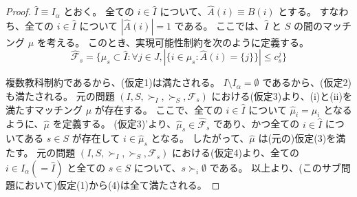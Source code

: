\documentclass[12pt, a4paper]{article}
\theoremstyle{definition}
\theoremstyle{remark}
\theoremstyle{plain}
\begin{document}
\begin{proof}

$\widehat{I} \equiv I_\alpha$ とおく。
全ての $i \in \widehat{I}$ について、$\widehat{A}(i) \equiv B(i)$ とする。
すなわち、全ての $i \in \widehat{I}$ について $|\widehat{A}(i)| = 1$ である。
ここでは、$\widehat{I}$ と $S$ の間のマッチング $\mu$ を考える。
このとき、実現可能性制約を次のように定義する。
\[
\widehat{\mathcal{F}}_s = \{\mu_s \subset \widehat{I} : \forall j \in J, |\{i \in \mu_s : \widehat{A}(i)= \{j\}\}| \leq c_s^j\}
\]




複数教科制約であるから、(仮定1)は満たされる。
$I\setminus I_\alpha = \emptyset$ であるから、(仮定2)も満たされる。
元の問題 $(I,S,\succ_I,\succ_S,\mathcal{F}_s)$ における(仮定3)より、(i)と(ii)を満たすマッチング $\mu$ が存在する。
ここで、全ての $i \in \widehat{I}$ について $\widehat{\mu}_i = \mu_i$ となるように、$\widehat{\mu}$ を定義する。
(仮定3)'より、$\widehat{\mu}_s \in \widehat{\mathcal{F}}_s$ であり、かつ全ての $i \in \widehat{I}$ についてある $s \in S$ が存在して $i \in \widehat{\mu}_s$ となる。
したがって、$\widehat{\mu}$ は(元の)仮定(3)を満たす。
元の問題 $(I,S,\succ_I,\succ_S,\mathcal{F}_s)$ における(仮定4)より、全ての $i \in I_\alpha (=\widehat{I})$ と全ての $s \in S$ について、$s \succ_i \emptyset$ である。
以上より、(このサブ問題において)仮定(1)から(4)は全て満たされる。



\end{proof}
\end{document}
